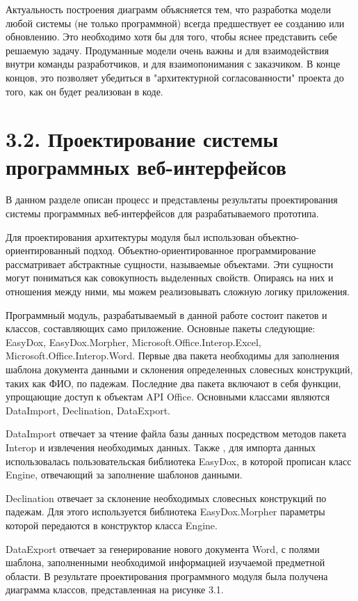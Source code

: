 Актуальность построения диаграмм объясняется тем, что разработка модели любой системы (не только программной) всегда предшествует ее созданию или обновлению. Это необходимо хотя бы для того, чтобы яснее представить себе решаемую задачу. Продуманные модели очень важны и для взаимодействия внутри команды разработчиков, и для взаимопонимания с заказчиком. В конце концов, это позволяет убедиться в "архитектурной согласованности" проекта до того, как он будет реализован в коде.



\section{3.2. Проектирование системы программных веб-интерфейсов}


В данном разделе описан процесс и представлены результаты проектирования системы программных веб-интерфейсов для разрабатываемого прототипа.


Для проектирования архитектуры модуля был использован объектно- ориентированный подход.
Объектно-ориентированное программирование рассматривает абстрактные сущности, называемые объектами. Эти сущности могут пониматься как совокупность выделенных свойств. Опираясь на них и отношения между ними, мы можем реализовывать сложную логику приложения. 

Программный модуль, разрабатываемый в данной работе состоит пакетов и классов, составляющих само приложение. Основные пакеты следующие: EasyDox, EasyDox.Morpher, Microsoft.Office.Interop.Excel, Microsoft.Office.Interop.Word. Первые два пакета необходимы для заполнения шаблона документа данными и склонения определенных словесных конструкций, таких как ФИО, по падежам. Последние два пакета включают в себя функции, упрощающие доступ к объектам API Office. Основными классами являются DataImport, Declination, DataExport.

DataImport отвечает за чтение файла базы данных посредством методов пакета Interop и извлечения необходимых данных. Также , для импорта данных использовалась пользовательская библиотека EasyDox, в которой прописан класс Engine, отвечающий за заполнение шаблонов данными.

Declination отвечает за склонение необходимых словесных конструкций по падежам. Для этого используется библиотека EasyDox.Morpher параметры которой передаются в конструктор класса Engine.
 
DataExport отвечает за генерирование нового документа Word, с полями шаблона, заполненными необходимой информацией изучаемой предметной области.
В результате проектирования программного модуля была получена диаграмма классов, представленная на рисунке 3.1.


